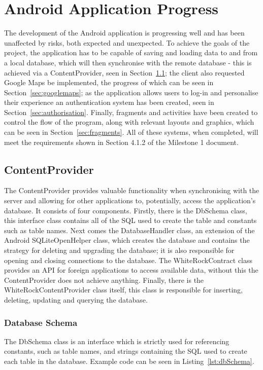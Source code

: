 \documentclass[11pt,a4paper]{article}
\begin{document}
\section{Android Application Progress}
The development of the Android application is progressing well and has been unaffected by risks, both expected and unexpected. To achieve the goals of the project, the application has to be capable of saving and loading data to and from a local database, which will then synchronise with the remote database - this is achieved via a ContentProvider, seen in Section~\ref{sec:contentprovier}; the client also requested Google Maps be implemented, the progress of which can be seen in Section~\ref{sec:googlemaps}; as the application allows users to log-in and personalise their experience an authentication system has been created, seen in Section~\ref{sec:authorisation}. Finally, fragments and activities have been created to control the flow of the program, along with relevant layouts and graphics, which can be seen in Section~\ref{sec:fragments}. All of these systems, when completed, will meet the requirements shown in Section 4.1.2 of the Milestone 1 document. %
\subsection{ContentProvider}
\label{sec:contentprovier}
The ContentProvider provides valuable functionality when synchronising with the server and allowing for other applications to, potentially, access the application's database. It consists of four components. Firstly, there is the DbSchema class, this interface class contains all of the SQL used to create the table and constants such as table names. Next comes the DatabaseHandler class, an extension of the Android SQLiteOpenHelper class, which creates the database and contains the strategy for deleting and upgrading the database; it is also responsible for opening and closing connections to the database. The WhiteRockContract class provides an API for foreign applications to access available data, without this the ContentProvider does not achieve anything. Finally, there is the WhiteRockContentProvider class itself, this class is responsible for inserting, deleting, updating and querying the database.

\subsubsection{Database Schema}
The DbSchema class is an interface which is strictly used for referencing constants, such as table names, and strings containing the SQL used to create each table in the database. Example code can be seen in Listing~\ref{lst:dbSchema}.
\end{document}
